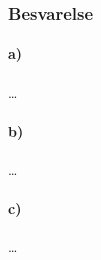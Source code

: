 \documentclass[../main.tex]{subfiles}
\begin{document}
\subsubsection{Besvarelse}


\paragraph{a)}

\ldots



\paragraph{b)}

\ldots



\paragraph{c)}

\ldots



\end{document}
